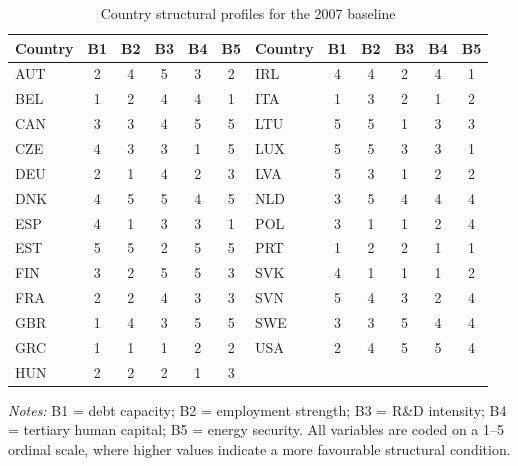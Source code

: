 
\begin{table}[ht]
\centering
\caption{Country structural profiles for the 2007 baseline}
\label{tab:country_profiles_2007}
\scriptsize
\renewcommand{\arraystretch}{1.12}
\setlength{\tabcolsep}{4pt}
\begin{tabular}{lccccc lccccc}
\toprule
\textbf{Country} & \textbf{B1} & \textbf{B2} & \textbf{B3} & \textbf{B4} & \textbf{B5}
& \textbf{Country} & \textbf{B1} & \textbf{B2} & \textbf{B3} & \textbf{B4} & \textbf{B5} \\
\midrule
AUT & 2 & 4 & 5 & 3 & 2 & IRL & 4 & 4 & 2 & 4 & 1 \\
BEL & 1 & 2 & 4 & 4 & 1 & ITA & 1 & 3 & 2 & 1 & 2 \\
CAN & 3 & 3 & 4 & 5 & 5 & LTU & 5 & 5 & 1 & 3 & 3 \\
CZE & 4 & 3 & 3 & 1 & 5 & LUX & 5 & 5 & 3 & 3 & 1 \\
DEU & 2 & 1 & 4 & 2 & 3 & LVA & 5 & 3 & 1 & 2 & 2 \\
DNK & 4 & 5 & 5 & 4 & 5 & NLD & 3 & 5 & 4 & 4 & 4 \\
ESP & 4 & 1 & 3 & 3 & 1 & POL & 3 & 1 & 1 & 2 & 4 \\
EST & 5 & 5 & 2 & 5 & 5 & PRT & 1 & 2 & 2 & 1 & 1 \\
FIN & 3 & 2 & 5 & 5 & 3 & SVK & 4 & 1 & 1 & 1 & 2 \\
FRA & 2 & 2 & 4 & 3 & 3 & SVN & 5 & 4 & 3 & 2 & 4 \\
GBR & 1 & 4 & 3 & 5 & 5 & SWE & 3 & 3 & 5 & 4 & 4 \\
GRC & 1 & 1 & 1 & 2 & 2 & USA & 2 & 4 & 5 & 5 & 4 \\
HUN & 2 & 2 & 2 & 1 & 3 &  &  &  &  &  &  \\
\bottomrule
\end{tabular}
\vspace{2pt}
\begin{flushleft}
\scriptsize \textit{Notes:} B1 = debt capacity; B2 = employment strength; B3 = R\&D intensity; B4 = tertiary human capital; B5 = energy security. All variables are coded on a 1--5 ordinal scale, where higher values indicate a more favourable structural condition.
\end{flushleft}
\end{table}
